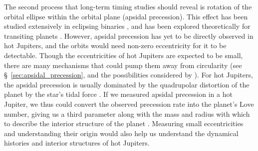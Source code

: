 \documentclass[12pt,twocolumn,tighten]{aastex62}
\begin{document}
The second process that long-term timing studies should reveal is
rotation of the orbital ellipse within the orbital plane (apsidal
precession).  This effect has been studied extensively in eclipsing
binaries \citep[{\it e.g.},][]{russell_notes_1939,
schwarzschild_structure_1958}, and has been explored theoretically for
transiting planets
\citep{heyl_using_2007,pal_periastron_2008,jordan_observability_2008,ragozzine_probing_2009}.
However, apsidal precession has yet to be directly observed in hot
Jupiters, and the orbits would need non-zero eccentricity for it to be
detectable.  Though the eccentricities of hot Jupiters are expected to
be small, there are many mechanisms that could pump them away from
circularity (see \S~\ref{sec:apsidal_precession}, and the
possibilities considered by \citealt{bailey_understanding_2019}).  For
hot Jupiters, the apsidal precession is usually dominated by the
quadrupolar distortion of the planet by the star's tidal force
\citep{ragozzine_probing_2009}.  If we measured apsidal precession in
a hot Jupiter, we thus could convert the observed precession rate into
the planet's Love number, giving us a third parameter along with the
mass and radius with which to describe the interior structure of the
planet \citep[{\it e.g.},][who performed a similar procedure for
HAT-P-13b]{batygin_determination_2009}.  Measuring small
eccentricities and understanding their origin would also help us
understand the dynamical histories and interior structures of hot
Jupiters.  \citep[{\it
e.g.},][respectively]{dawson_origins_2018,ibgui_tidal_2010}

% 
\end{document}
